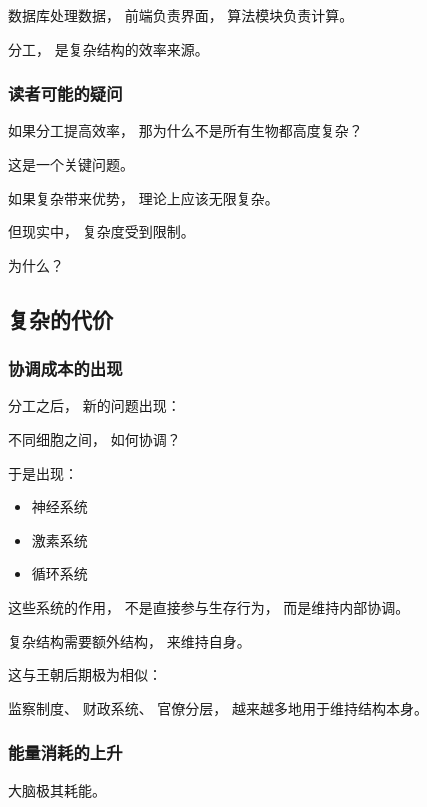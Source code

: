 \documentclass[openany, a4paper, 12pt]{book}
\begin{document}
数据库处理数据，
前端负责界面，
算法模块负责计算。

分工，
是复杂结构的效率来源。

\subsubsection{读者可能的疑问}

\begin{questionbox}
	如果分工提高效率，
	那为什么不是所有生物都高度复杂？
\end{questionbox}

这是一个关键问题。

如果复杂带来优势，
理论上应该无限复杂。

但现实中，
复杂度受到限制。

为什么？

\subsection{复杂的代价}

\subsubsection{协调成本的出现}

分工之后，
新的问题出现：

不同细胞之间，
如何协调？

于是出现：

\begin{itemize}
	\item 神经系统
	\item 激素系统
	\item 循环系统
\end{itemize}

这些系统的作用，
不是直接参与生存行为，
而是维持内部协调。

\begin{readingnote}
	复杂结构需要额外结构，
	来维持自身。
\end{readingnote}

这与王朝后期极为相似：

监察制度、
财政系统、
官僚分层，
越来越多地用于维持结构本身。

\subsubsection{能量消耗的上升}

大脑极其耗能。
\end{document}
